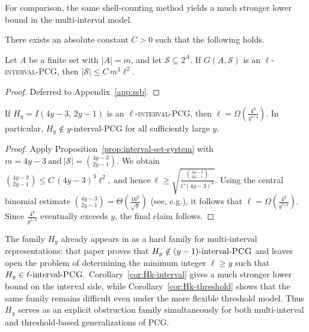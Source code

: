 \documentclass[a4paper,UKenglish,cleveref,autoref,thm-restate]{socg-lipics-v2021}
\begin{document}
For comparison, the same shell-counting method yields a much stronger lower bound in the
multi-interval model.

\begin{proposition}\label{prop:interval-set-system}
There exists an absolute constant \(C>0\) such that the following holds.

Let \(A\) be a finite set with \(|A|=m\), and let \(\mathcal S\subseteq 2^A\). If
\(G(A,\mathcal S)\) is an \textsc{$\ell$-interval-\textsc{PCG}}, then
\(
|\mathcal S|\le C\,m^3\ell^2.
\)
\end{proposition}

\begin{proof}
Deferred to Appendix~\ref{app:ssb}.
\end{proof}


\begin{corollary}\label{cor:Hk-interval}
If
\(
H_y=I(4y-3,\,2y-1)
\)
is an \textsc{$\ell$-interval-\textsc{PCG}}, then
\(
\ell=\Omega\!\left(\frac{4^y}{y^{7/4}}\right).
\)
In particular, \(H_y\notin y\)-interval-\textsc{PCG} for all sufficiently large \(y\).
\end{corollary}

\begin{proof}
Apply Proposition~\ref{prop:interval-set-system} with
\(
m=4y-3
\ \text{and}\ 
|\mathcal S|=\binom{4y-3}{2y-1}.
\)
We obtain
\(
\binom{4y-3}{2y-1}\le C\,(4y-3)^3\ell^2,
\ \text{and hence}\ 
\ell\ge
\sqrt{\frac{\binom{4y-3}{2y-1}}{C(4y-3)^3}}.
\)
Using the central binomial estimate
\(
\binom{4y-3}{2y-1}=\Theta\!\left(\frac{16^y}{\sqrt{y}}\right)
\) (see, e.g.\cite{Graham1994Concrete}), 
it follows that
\(
\ell=\Omega\!\left(\frac{4^y}{y^{7/4}}\right).
\)
Since \(\frac{4^y}{y^{7/4}}\) eventually exceeds \(y\), the final claim follows.
\end{proof}

The family \(H_y\) already appears in \cite{Calamoneri2021OnGOI} as a hard family for
multi-interval representations: that paper proves that
\(
H_y\notin (y-1)\text{-interval-}\textsc{PCG}
\)
and leaves open the problem of determining the minimum integer \(\ell\ge y\) such that
\(
H_y\in \ell\text{-interval-}\textsc{PCG}.
\)
Corollary~\ref{cor:Hk-interval} gives a much stronger lower bound on the interval side,
while Corollary~\ref{cor:Hk-threshold} shows that the same family remains difficult even
under the more flexible threshold model. Thus \(H_y\) serves as an explicit obstruction
family simultaneously for both multi-interval and threshold-based generalizations of
\textsc{PCG}.
\end{document}
